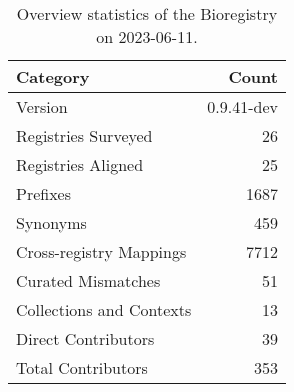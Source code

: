 \begin{table}
\caption{Overview statistics of the Bioregistry on 2023-06-11.}
\label{tab:bioregistry-summary}
\begin{tabular}{lr}
\toprule
Category & Count \\
\midrule
Version & 0.9.41-dev \\
Registries Surveyed & 26 \\
Registries Aligned & 25 \\
Prefixes & 1687 \\
Synonyms & 459 \\
Cross-registry Mappings & 7712 \\
Curated Mismatches & 51 \\
Collections and Contexts & 13 \\
Direct Contributors & 39 \\
Total Contributors & 353 \\
\bottomrule
\end{tabular}
\end{table}

